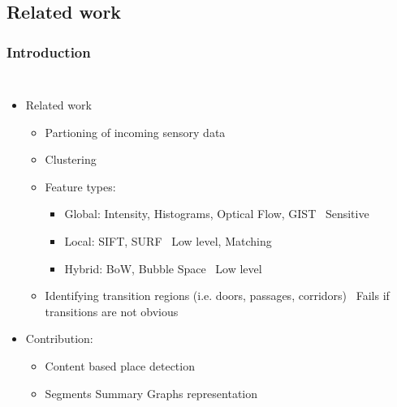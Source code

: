 \subsection{Related work}
\frame
{
	\frametitle{Introduction}
	
	\begin{columns}[t,onlytextwidth]
		\hspace*{-1cm}
		
		\vspace{-0.5cm}
		\begin{itemize}
			\item Related work
			\begin{itemize}
				\item Partioning of incoming sensory data
				\item Clustering
				\item Feature types:
				\begin{itemize}
					\item Global: Intensity, Histograms, Optical Flow, GIST \textcolor{red}{\xmark} ~Sensitive
					\item Local: SIFT, SURF \textcolor{red}{\xmark} ~Low level, Matching
					\item Hybrid: BoW, Bubble Space \textcolor{red}{\xmark} ~Low level
				\end{itemize}
			\item Identifying transition regions (i.e. doors, passages, corridors) \textcolor{red}{\xmark} ~Fails if transitions are not obvious 
				
				
			\end{itemize}

			\item Contribution:
			\begin{itemize}
				\item Content based place detection
				\item Segments Summary Graphs representation
			\end{itemize}
			
		\end{itemize}
	\end{columns}
}
